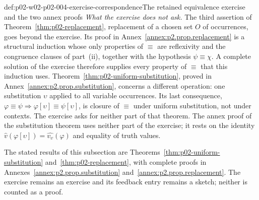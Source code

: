 \begin{hbconvention}{def:p02-w02-p02-004-exercise-correspondence}{The retained equivalence exercise and the two annex proofs}
\emph{What the exercise does not ask.}  The third assertion of
Theorem~\ref{thm:p02-replacement}, replacement of a chosen set \(O\) of
occurrences, goes beyond the exercise.  Its proof in
Annex~\ref{annex:p2.prop.replacement} is a structural induction whose only
properties of \(\equiv\) are reflexivity and the congruence clauses of
part~(ii), together with the hypothesis \(\psi\equiv\chi\).  A complete
solution of the exercise therefore supplies every property of \(\equiv\) that
this induction uses.  Theorem~\ref{thm:p02-uniform-substitution}, proved in
Annex~\ref{annex:p2.prop.substitution}, concerns a different operation: one
substitution \(\upsilon\) applied to all variable occurrences.  Its last
consequence,
\(\varphi\equiv\psi\Rightarrow\varphi[\upsilon]\equiv\psi[\upsilon]\), is
closure of \(\equiv\) under uniform substitution, not under contexts.  The
exercise asks for neither part of that theorem.  The annex proof of the
substitution theorem uses neither part of the exercise; it rests on the
identity \(\widehat v(\varphi[\upsilon])=\widehat{v_\upsilon}(\varphi)\) and
equality of truth values.

The stated results of this subsection are
Theorems~\ref{thm:p02-uniform-substitution} and~\ref{thm:p02-replacement},
with complete proofs in Annexes~\ref{annex:p2.prop.substitution}
and~\ref{annex:p2.prop.replacement}.  The exercise remains an exercise and
its feedback entry remains a sketch; neither is counted as a proof.
\end{hbconvention}

